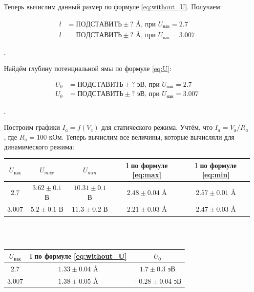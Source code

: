 \documentclass[a4paper, 12pt]{article}
\newcounter{Points}
\newcommand{\point}{\arabic{Points}. \addtocounter{Points}{1}}
\begin{document}
Теперь вычислим данный размер по формуле \eqref{eq:without_U}. Получаем:

\begin{align*}
    l &= ПОДСТАВИТЬ \pm ? \text{ \AA, при } U_{нак} = 2.7 \\
    l &= ПОДСТАВИТЬ \pm ? \text{ \AA, при } U_{нак} = 3.007
\end{align*}

\point Найдём глубину потенциальной ямы по формуле \eqref{eq:U}:

\begin{align*}
    U_0 &= ПОДСТАВИТЬ \pm ? \text{ эВ, при } U_{нак} = 2.7 \\
    U_0 &= ПОДСТАВИТЬ \pm ? \text{ эВ, при } U_{нак} = 3.007
\end{align*}


\point Построим графики $I_a = f(V_c)$ для статического режима. Учтём, что $I_a = V_a / R_a$, где $R_a = 100$ кОм. Теперь вычислим все величины, которые вычисляли для динамического режима:

\begin{table}[H]
    \centering
    \begin{tabular}{|c|c|c|c|c|}
        \hline
        $U_{нак}$ & $U_{max}$ & $U_{min}$ & l по формуле \eqref{eq:max} & l по формуле \eqref{eq:min} \\ \hline
        $2.7$ & $3.62 \pm 0.1$ В & $ 10.31 \pm 0.1$ В & $2.48 \pm 0.04$ \AA & $2.57 \pm 0.01$ \AA \\ \hline

        $3.007$ & $5.2 \pm 0.1$ В & $11.3 \pm 0.2$ В & $2.21 \pm 0.03$ \AA & $2.47 \pm 0.03$ \AA \\ \hline
    \end{tabular}
    ~\\ ~\\
    \begin{tabular}{|c|c|c|}
        \hline
        $U_{нак}$ & l по формуле \eqref{eq:without_U} & $U_0$ \\ \hline
        $2.7$ & $1.33 \pm 0.04$ \AA & $1.7 \pm 0.3$ эВ \\ \hline
        $3.007$ & $1.38 \pm 0.05$ \AA & $-0.28 \pm 0.04$ эВ \\ \hline
    \end{tabular}
\end{table}
\end{document}
